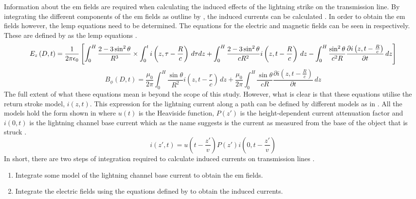Information about the \gls{em} fields are required when calculating the induced effects of the lightning strike on the transmission line. By integrating the different components of the \gls{em} fields as outline by \citeauthor{Agrawal1980}, the induced currents can be calculated \cite{Agrawal1980}. In order to obtain the \gls{em} fields however, the \gls{lemp} equations need to be determined. The equations for the electric and magnetic fields can be seen in  respectively. These are defined by \citeauthor{Uman1975} as the \gls{lemp} equations \cite{Uman1975}.
\begin{dmath}
    E_z \left( D,t \right)=\frac{1}{2\pi\epsilon_0}\left[\int_{0}^{H}\frac{2 - 3\sin^{2}{\theta}}{R^3} \times \int_{0}^{t} i \left( z, \tau - \frac{R}{c} \right) \, d\tau dz \\ + \int_{0}^{H} \frac{2 - 3\sin^{2}{\theta}}{c R^2} i \left( z, t - \frac{R}{c} \right) \, dz - \int_{0}^{H} \frac{\sin^{2}{\theta}}{c^2 R} \frac{\partial i\left ( z, t - \frac{R}{c} \right )}{\partial t} \, dz \right ]
    \label{eqn:e_field}
\end{dmath}
\begin{dmath}
    B_{\phi} \left( D,t \right) = \frac{\mu_0}{2\pi} \int_{0}^{H} \frac{\sin{\theta}}{R^2} i \left ( z, t - \frac{r}{c} \right ) \, dz + \frac{\mu_0}{2\pi} \int_{0}^{H} \frac{\sin{\theta}}{cR} \frac{\partial i \left ( z, t - \frac{R}{c} \right )}{\partial t} \, dz
    \label{eqn:b_field}
\end{dmath}
The full extent of what these equations mean is beyond the scope of this study. However, what is clear is that these equations utilise the return stroke model, $i \left( z, t \right)$. This expression for the lightning current along a path can be defined by different models as in \cite{Paolone2009,ZhangFeizhouandLiuShanghe2002,Nucci2003}. All the models hold the form shown in  where $u(t)$ is the Heaviside function, $P(z')$ is the height-dependent current attenuation factor and $i(0,t)$ is the lightning channel base current which as the name suggests is the current as measured from the base of the object that is struck \cite{Paolone2009,ZhangFeizhouandLiuShanghe2002,Javor2011}.
\begin{equation}
    i(z',t)=u\left( t - \frac{z'}{v}\right) P \left( z' \right) i \left( 0,t - \frac{z'}{v} \right)
    \label{eqn:rsm}
\end{equation}
In short, there are two steps of integration required to calculate induced currents on transmission lines \cite{Nucci2010,Nucci2003,Paolone2009}.
\begin{enumerate}
    \item Integrate some model of the lightning channel base current to obtain the \gls{em} fields.
    \item Integrate the electric fields using the equations defined by \citeauthor{Agrawal1980} to obtain the induced currents.
\end{enumerate}

